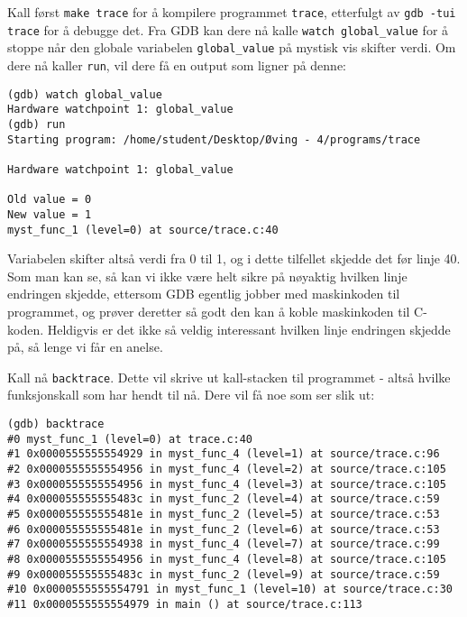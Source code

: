 Kall først \verb|make trace| for å kompilere programmet \verb|trace|, etterfulgt av \verb|gdb -tui| \verb|trace| for å debugge det. Fra GDB kan dere nå kalle \verb|watch global_value| for å stoppe når den globale variabelen \verb|global_value| på mystisk vis skifter verdi. Om dere nå kaller \verb|run|, vil dere få en output som ligner på denne:


\begin{lstlisting}[mathescape=true,keywordstyle=\color{black}]
(gdb) watch global_value
Hardware watchpoint 1: global_value
(gdb) run
Starting program: /home/student/Desktop/Øving - 4/programs/trace

Hardware watchpoint 1: global_value

Old value = 0
New value = 1
myst_func_1 (level=0) at source/trace.c:40

\end{lstlisting}


Variabelen skifter altså verdi fra 0 til 1, og i dette tilfellet skjedde det før linje 40. Som man kan se, så kan vi ikke være helt sikre på nøyaktig hvilken linje endringen skjedde, ettersom GDB egentlig jobber med maskinkoden til programmet, og prøver deretter så godt den kan å koble maskinkoden til C-koden. Heldigvis er det ikke så veldig interessant hvilken linje endringen skjedde på, så lenge vi får en anelse. 

Kall nå \verb|backtrace|. Dette vil skrive ut kall-stacken til programmet - altså hvilke funksjonskall som har hendt til nå. Dere vil få noe som ser slik ut:

\begin{lstlisting}[mathescape=true,keywordstyle=\color{black}]
(gdb) backtrace
#0 myst_func_1 (level=0) at trace.c:40
#1 0x0000555555554929 in myst_func_4 (level=1) at source/trace.c:96
#2 0x0000555555554956 in myst_func_4 (level=2) at source/trace.c:105
#3 0x0000555555554956 in myst_func_4 (level=3) at source/trace.c:105
#4 0x000055555555483c in myst_func_2 (level=4) at source/trace.c:59
#5 0x000055555555481e in myst_func_2 (level=5) at source/trace.c:53
#6 0x000055555555481e in myst_func_2 (level=6) at source/trace.c:53
#7 0x0000555555554938 in myst_func_4 (level=7) at source/trace.c:99
#8 0x0000555555554956 in myst_func_4 (level=8) at source/trace.c:105
#9 0x000055555555483c in myst_func_2 (level=9) at source/trace.c:59
#10 0x0000555555554791 in myst_func_1 (level=10) at source/trace.c:30
#11 0x0000555555554979 in main () at source/trace.c:113

\end{lstlisting}

